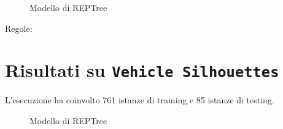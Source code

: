 \begin{mdframed}[frametitle=Esecuzione REPTree]
	\scriptsize
\end{mdframed}



\begin{figure}[htb]
	\caption{Modello di REPTree}
\end{figure}

\begin{mdframed}[frametitle=Esecuzione JRip]
	\scriptsize
\end{mdframed}



\noindent
\normalsize Regole:
\scriptsize

\pagebreak

\section{Risultati su \texttt{Vehicle Silhouettes}}

\normalsize L'esecuzione ha coinvolto 761 istanze di training e 85 istanze di testing.

\begin{mdframed}[frametitle=Esecuzione REPTree]
	\scriptsize
\end{mdframed}



\begin{figure}[htb]
	\caption{Modello di REPTree}
\end{figure}

